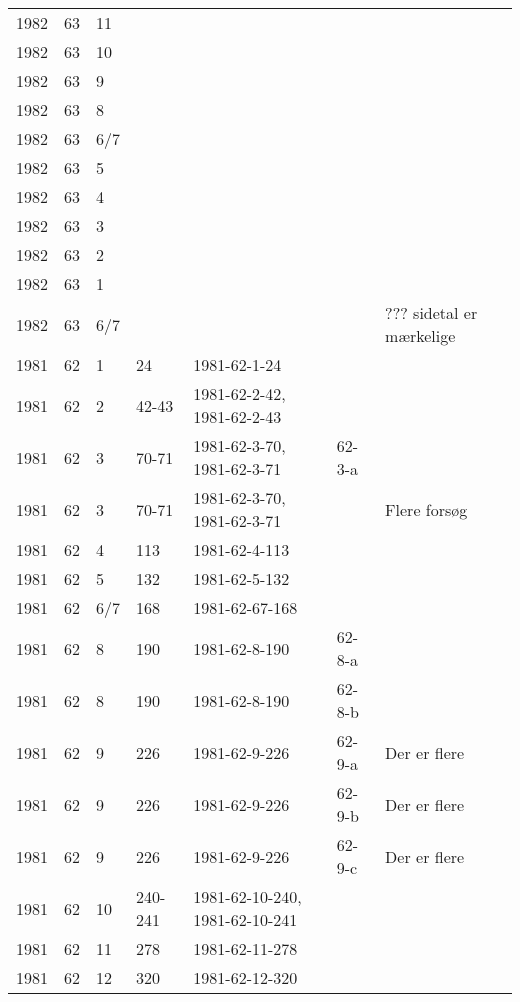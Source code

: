 \begin{longtable}{ |l|l|l|l|p{2.7cm}|l|p{2cm}| }
 1982 & 63 &    11 &         &                &  & \\
 1982 & 63 &    10 &         &                &  & \\
 1982 & 63 &     9 &         &                &  & \\
 1982 & 63 &     8 &         &                &  & \\
 1982 & 63 &   6/7 &         &                &  & \\
 1982 & 63 &     5 &         &                &  & \\
 1982 & 63 &     4 &         &                &  & \\
 1982 & 63 &     3 &         &                &  & \\
 1982 & 63 &     2 &         &                &  & \\
 1982 & 63 &     1 &         &                &  & \\
 1982 & 63 &   6/7 &         &                &  & ??? sidetal er mærkelige \\
 1981 & 62 &     1 &      24 &   1981-62-1-24 &  & \\
 1981 & 62 &     2 &   42-43 & 1981-62-2-42, 1981-62-2-43 &  & \\
 1981 & 62 &     3 &   70-71 & 1981-62-3-70, 1981-62-3-71 & 62-3-a & \\
 1981 & 62 &   3 &   70-71 & 1981-62-3-70, 1981-62-3-71 &  & Flere forsøg \\
 1981 & 62 &     4 &     113 &  1981-62-4-113 &  & \\
 1981 & 62 &     5 &     132 &  1981-62-5-132 &  & \\
 1981 & 62 &   6/7 &     168 & 1981-62-67-168 &  & \\
 1981 & 62 &     8 &     190 &  1981-62-8-190 & 62-8-a & \\
 1981 & 62 &     8 &     190 &  1981-62-8-190 & 62-8-b & \\
 1981 & 62 &     9 &     226 &  1981-62-9-226 &  62-9-a & Der er flere \\
 1981 & 62 &     9 &     226 &  1981-62-9-226 &  62-9-b & Der er flere \\
 1981 & 62 &     9 &     226 &  1981-62-9-226 &  62-9-c & Der er flere \\
 1981 & 62 &    10 & 240-241 & 1981-62-10-240, 1981-62-10-241 &  & \\
 1981 & 62 &    11 &     278 & 1981-62-11-278 &  & \\
 1981 & 62 &    12 &     320 & 1981-62-12-320 &  & \\

\end{longtable}
